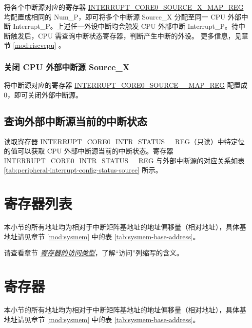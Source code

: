 \documentclass[main\_\_CN.tex]{subfiles}
\begin{document}
将各个中断源对应的寄存器 \hyperref[regdesc:INTERRUPTCORE0CACHECORE0ACSINTMAPREG]{INTERRUPT\_CORE0\_SOURCE\_X\_MAP\_REG} 均配置成相同的 Num\_P，即可将多个中断源 Source\_X 分配至同一 CPU 外部中断 Interrupt\_P。上述任一外设中断均会触发 CPU 外部中断 Interrupt\_P。待中断触发后，CPU 需查询中断状态寄存器，判断产生中断的外设。 更多信息，见章节 \ref{mod:riscvcpu} \textit{}。

\subsubsection{关闭 CPU 外部中断源 Source\_X}

将中断源对应的寄存器 \hyperref[regdesc:INTERRUPTCORE0CACHECORE0ACSINTMAPREG]{INTERRUPT\_CORE0\_SOURCE\_\_MAP\_REG} 配置成 0，即可关闭外部中断源。



\subsection{查询外部中断源当前的中断状态}

读取寄存器 \hyperref[regdesc:INTERRUPTCORE0INTRSTATUS0REG]{INTERRUPT\_CORE0\_INTR\_STATUS\_\_REG}（只读）中特定位的值可以获取 CPU 外部中断源当前的中断状态。寄存器 \hyperref[regdesc:INTERRUPTCORE0INTRSTATUS0REG]{INTERRUPT\_CORE0\_INTR\_STATUS\_\_REG} 与外部中断源的对应关系如表 \ref{tab:peripheral-interrupt-config-status-source} 所示。

\begin{landscape}


\hypertarget{intmtrx-reg-summ}{}
\section{寄存器列表}
\label{sec:intmtrx-reg-summ}
本小节的所有地址均为相对于中断矩阵基地址的地址偏移量（相对地址），具体基地址请见章节 \ref{mod:sysmem} \textit{} 中的表 \ref{tab:sysmem-base-address}。

请查看章节 \hyperref[glossary-access-types]{\textit{寄存器的访问类型}}，了解“访问”列缩写的含义。


\end{landscape}



\clearpage
\section{寄存器}

本小节的所有地址均为相对于中断矩阵基地址的地址偏移量（相对地址），具体基地址请见章节 \ref{mod:sysmem} \textit{} 中的表 \ref{tab:sysmem-base-address}。


\end{document}
